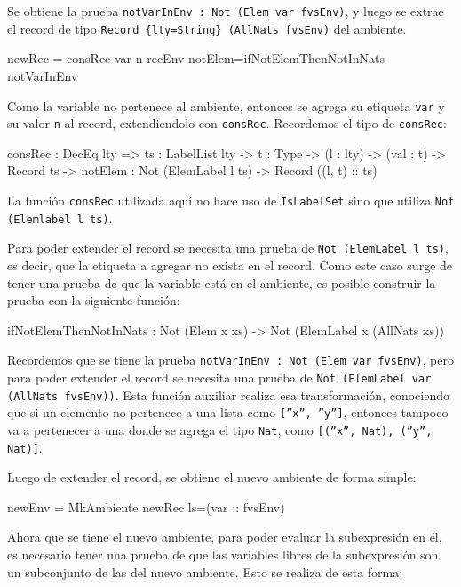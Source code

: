 Se obtiene la prueba \texttt{notVarInEnv : Not (Elem var fvsEnv)}, y luego se extrae el record de tipo \texttt{Record \{lty=String\} (AllNats fvsEnv)} del ambiente.

\begin{code}
newRec = consRec var n recEnv
  {notElem=ifNotElemThenNotInNats notVarInEnv}
\end{code}

Como la variable no pertenece al ambiente, entonces se agrega su etiqueta \texttt{var} y su valor \texttt{n} al record, extendiendolo con \texttt{consRec}. Recordemos el tipo de \texttt{consRec}:

\begin{code}
consRec : DecEq lty => {ts : LabelList lty} -> {t : Type} ->
  (l : lty) -> (val : t) -> Record ts ->
  {notElem : Not (ElemLabel l ts)} -> Record ((l, t) :: ts)
\end{code}

La función \texttt{consRec} utilizada aquí no hace uso de \texttt{IsLabelSet} sino que utiliza \texttt{Not (Elemlabel l ts)}.

Para poder extender el record se necesita una prueba de \texttt{Not (ElemLabel l ts)}, es decir, que la etiqueta a agregar no exista en el record. Como este caso surge de tener una prueba de que la variable está en el ambiente, es posible construir la prueba con la siguiente función:

\begin{code}
ifNotElemThenNotInNats : Not (Elem x xs) ->
  Not (ElemLabel x (AllNats xs))
\end{code}

Recordemos que se tiene la prueba \texttt{notVarInEnv : Not (Elem var fvsEnv)}, pero para poder extender el record se necesita una prueba de \texttt{Not (ElemLabel var (AllNats fvsEnv))}. Esta función auxiliar realiza esa transformación, conociendo que si un elemento no pertenece a una lista como \texttt{[''x'', ''y'']}, entonces tampoco va a pertenecer a una donde se agrega el tipo \texttt{Nat}, como \texttt{[(''x'', Nat), (''y'', Nat)]}.

Luego de extender el record, se obtiene el nuevo ambiente de forma simple:

\begin{code}
newEnv = MkAmbiente newRec {ls=(var :: fvsEnv)}
\end{code}

Ahora que se tiene el nuevo ambiente, para poder evaluar la subexpresión en él, es necesario tener una prueba de que las variables libres de la subexpresión son un subconjunto de las del nuevo ambiente. Esto se realiza de esta forma:

